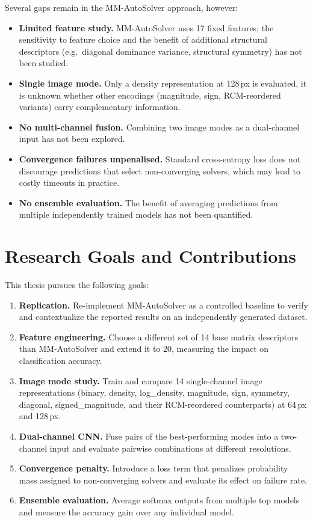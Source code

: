 Several gaps remain in the MM-AutoSolver approach, however:

\begin{itemize}
  \item \textbf{Limited feature study.} MM-AutoSolver uses 17 fixed features; the sensitivity to feature choice and the benefit of additional structural descriptors (e.g.\ diagonal dominance variance, structural symmetry) has not been studied.
  \item \textbf{Single image mode.} Only a density representation at 128\,px is evaluated, it is unknown whether other encodings (magnitude, sign, RCM-reordered variants) carry complementary information.
  \item \textbf{No multi-channel fusion.} Combining two image modes as a dual-channel input has not been explored.
  \item \textbf{Convergence failures unpenalised.} Standard cross-entropy loss does not discourage predictions that select non-converging solvers, which may lead to costly timeouts in practice.
  \item \textbf{No ensemble evaluation.} The benefit of averaging predictions from multiple independently trained models has not been quantified.
\end{itemize}

\section{Research Goals and Contributions}\label{sec:contributions}

This thesis pursues the following goals:

\begin{enumerate}
  \item \textbf{Replication.} Re-implement MM-AutoSolver as a controlled baseline to verify and contextualize the reported results on an independently generated dataset.
  \item \textbf{Feature engineering.} Choose a different set of 14 base matrix descriptors than MM-AutoSolver and extend it to 20, measuring the impact on classification accuracy.
  \item \textbf{Image mode study.} Train and compare 14 single-channel image representations (binary, density, log\_density, magnitude, sign, symmetry, diagonal, signed\_magnitude, and their RCM-reordered counterparts) at 64\,px and 128\,px.
  \item \textbf{Dual-channel CNN.} Fuse pairs of the best-performing modes into a two-channel input and evaluate pairwise combinations at different resolutions.
  \item \textbf{Convergence penalty.} Introduce a loss term that penalizes probability mass assigned to non-converging solvers and evaluate its effect on failure rate.
  \item \textbf{Ensemble evaluation.} Average softmax outputs from multiple top models and measure the accuracy gain over any individual model.
\end{enumerate}

